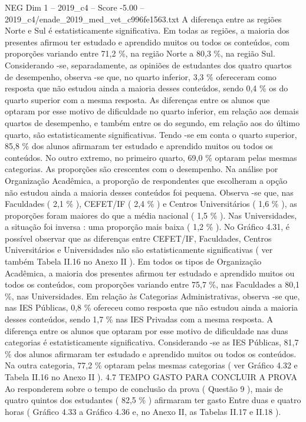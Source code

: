\begin{textsample}{NEG Dim 1 – 2019\_c4 – Score -5.00 – 2019\_c4/enade\_2019\_med\_vet\_c996fe1563.txt}
A diferença entre as regiões Norte e Sul é estatisticamente significativa.
Em todas as regiões, a maioria dos presentes afirmou ter estudado e aprendido muitos ou todos os conteúdos, com proporções variando entre 71,2 \%, na região Norte a 80,3 \%, na região Sul.
Considerando -se, separadamente, as opiniões de estudantes dos quatro quartos de desempenho, observa -se que, no quarto inferior, 3,3 \% ofereceram como resposta que não estudou ainda a maioria desses conteúdos, sendo 0,4 \% os do quarto superior com a mesma resposta.
As diferenças entre os alunos que optaram por esse motivo de dificuldade no quarto inferior, em relação aos demais quartos de desempenho, e também entre os do segundo, em relação aos do último quarto, são estatisticamente significativas.
Tendo -se em conta o quarto superior, 85,8 \% dos alunos afirmaram ter estudado e aprendido muitos ou todos os conteúdos.
No outro extremo, no primeiro quarto, 69,0 \% optaram pelas mesmas categorias.
As proporções são crescentes com o desempenho.
Na análise por Organização Acadêmica, a proporção de respondentes que escolheram a opção não estudou ainda a maioria desses conteúdos foi pequena.
Observa -se que, nas Faculdades ( 2,1 \% ), CEFET/IF ( 2,4 \% ) e Centros Universitários ( 1,6 \% ), as proporções foram maiores do que a média nacional ( 1,5 \% ).
Nas Universidades, a situação foi inversa : uma proporção mais baixa ( 1,2 \% ).
No Gráfico 4.31, é possível observar que as diferenças entre CEFET/IF, Faculdades, Centros Universitários e Universidades não são estatisticamente significativas ( ver também Tabela II.16 no Anexo II ).
Em todos os tipos de Organização Acadêmica, a maioria dos presentes afirmou ter estudado e aprendido muitos ou todos os conteúdos, com proporções variando entre 75,7 \%, nas Faculdades a 80,1 \%, nas Universidades.
Em relação às Categorias Administrativas, observa -se que, nas IES Públicas, 0,8 \% ofereceu como resposta que não estudou ainda a maioria desses conteúdos, sendo 1,7 \% nas IES Privadas com a mesma resposta.
A diferença entre os alunos que optaram por esse motivo de dificuldade nas duas categorias é estatisticamente significativa.
Considerando -se as IES Públicas, 81,7 \% dos alunos afirmaram ter estudado e aprendido muitos ou todos os conteúdos.
Na outra categoria, 77,2 \% optaram pelas mesmas categorias ( ver Gráfico 4.32 e Tabela II.16 no Anexo II ). 4.7 TEMPO GASTO PARA CONCLUIR A PROVA Ao responderem sobre o tempo de conclusão da prova ( Questão 9 ), mais de quatro quintos dos estudantes ( 82,5 \% ) afirmaram ter gasto Entre duas e quatro horas ( Gráfico 4.33 a Gráfico 4.36 e, no Anexo II, as Tabelas II.17 e II.18 ).

\end{textsample}
